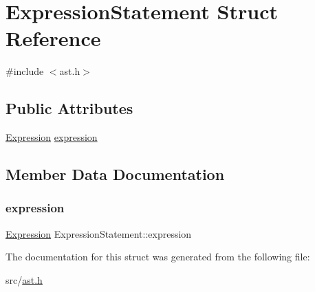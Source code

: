 \hypertarget{struct_expression_statement}{}\section{Expression\+Statement Struct Reference}
\label{struct_expression_statement}


{\ttfamily \#include $<$ast.\+h$>$}

\subsection*{Public Attributes}
\begin{DoxyCompactItemize}
\item 
\hyperlink{ast_8h_a4cb273a4d960cd13ea17d08f254493e8}{Expression} \hyperlink{struct_expression_statement_a673bc93b7ae7b8ebcf1810090568e03f}{expression}
\end{DoxyCompactItemize}


\subsection{Member Data Documentation}
\mbox{\label{struct_expression_statement_a673bc93b7ae7b8ebcf1810090568e03f}} 
\subsubsection{\texorpdfstring{expression}{expression}}
{\footnotesize\ttfamily \hyperlink{ast_8h_a4cb273a4d960cd13ea17d08f254493e8}{Expression} Expression\+Statement\+::expression}



The documentation for this struct was generated from the following file\+:\begin{DoxyCompactItemize}
\item 
src/\hyperlink{ast_8h}{ast.\+h}\end{DoxyCompactItemize}
